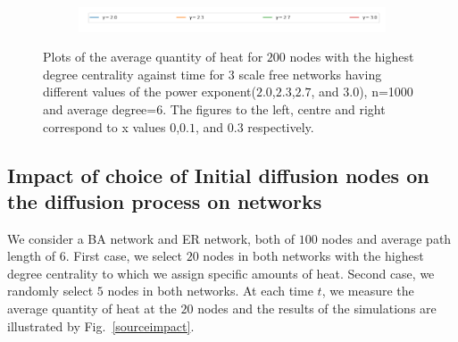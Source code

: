 \documentclass[10pt,a4paper]{article}
\theoremstyle{plain}
\theoremstyle{definition}
\begin{document}
\begin{figure}[H]
\begin{subfigure}[b]{0.32\textwidth}
     	\end{subfigure} \\
     	\begin{subfigure}[b]{0.80\textwidth}
     		\includegraphics[width= \textwidth]{images/legend-gamma.png}
     	\end{subfigure}
     	\caption{Plots of the average quantity of heat for $200$ nodes with the highest degree centrality against time for $3$ scale free networks having different values of the power exponent($2.0$,$2.3$,$2.7$, and $3.0$), n=1000 and average degree=$6$. The figures to the left, centre and right correspond to x values $0$,$0.1$, and $0.3$ respectively.}
     	\label{quantity-exponents}
     \end{figure}
 
     \subsection{Impact of choice of Initial diffusion nodes on the diffusion process on networks}
     We consider a BA network and ER network, both of $100$ nodes and average path length of $6$. First case, we select $20$ nodes in both networks with the highest degree centrality to which we assign specific amounts of heat. Second case, we randomly select $5$ nodes in both networks. At each time $t$, we measure the average quantity of heat at the $20$ nodes and the results of the simulations are illustrated by Fig.~\ref{sourceimpact}.
     
\end{document}
